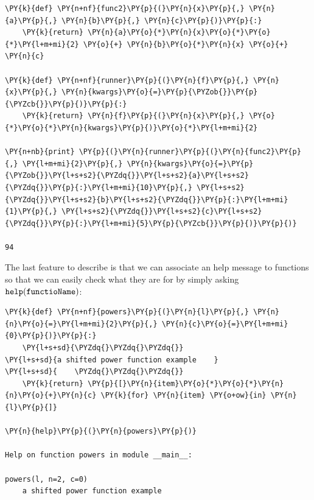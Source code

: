 \begin{codebox}
\begin{Verbatim}[commandchars=\\\{\}]
\PY{k}{def} \PY{n+nf}{func2}\PY{p}{(}\PY{n}{x}\PY{p}{,} \PY{n}{a}\PY{p}{,} \PY{n}{b}\PY{p}{,} \PY{n}{c}\PY{p}{)}\PY{p}{:}
    \PY{k}{return} \PY{n}{a}\PY{o}{*}\PY{n}{x}\PY{o}{*}\PY{o}{*}\PY{l+m+mi}{2} \PY{o}{+} \PY{n}{b}\PY{o}{*}\PY{n}{x} \PY{o}{+} \PY{n}{c}
 		
\PY{k}{def} \PY{n+nf}{runner}\PY{p}{(}\PY{n}{f}\PY{p}{,} \PY{n}{x}\PY{p}{,} \PY{n}{kwargs}\PY{o}{=}\PY{p}{\PYZob{}}\PY{p}{\PYZcb{}}\PY{p}{)}\PY{p}{:}
    \PY{k}{return} \PY{n}{f}\PY{p}{(}\PY{n}{x}\PY{p}{,} \PY{o}{*}\PY{o}{*}\PY{n}{kwargs}\PY{p}{)}\PY{o}{*}\PY{l+m+mi}{2}
 		
\PY{n+nb}{print} \PY{p}{(}\PY{n}{runner}\PY{p}{(}\PY{n}{func2}\PY{p}{,} \PY{l+m+mi}{2}\PY{p}{,} \PY{n}{kwargs}\PY{o}{=}\PY{p}{\PYZob{}}\PY{l+s+s2}{\PYZdq{}}\PY{l+s+s2}{a}\PY{l+s+s2}{\PYZdq{}}\PY{p}{:}\PY{l+m+mi}{10}\PY{p}{,} \PY{l+s+s2}{\PYZdq{}}\PY{l+s+s2}{b}\PY{l+s+s2}{\PYZdq{}}\PY{p}{:}\PY{l+m+mi}{1}\PY{p}{,} \PY{l+s+s2}{\PYZdq{}}\PY{l+s+s2}{c}\PY{l+s+s2}{\PYZdq{}}\PY{p}{:}\PY{l+m+mi}{5}\PY{p}{\PYZcb{}}\PY{p}{)}\PY{p}{)}
 
94
\end{Verbatim}
\end{codebox}
  
The last feature to describe is that we can associate an help message to functions so that 
we can easily check what they are for by simply asking $\tt{help(functioName)}$:

\begin{codebox}
\begin{Verbatim}[commandchars=\\\{\}]
\PY{k}{def} \PY{n+nf}{powers}\PY{p}{(}\PY{n}{l}\PY{p}{,} \PY{n}{n}\PY{o}{=}\PY{l+m+mi}{2}\PY{p}{,} \PY{n}{c}\PY{o}{=}\PY{l+m+mi}{0}\PY{p}{)}\PY{p}{:}
    \PY{l+s+sd}{\PYZdq{}\PYZdq{}\PYZdq{}}
\PY{l+s+sd}{a shifted power function example    }
\PY{l+s+sd}{    \PYZdq{}\PYZdq{}\PYZdq{}}
    \PY{k}{return} \PY{p}{[}\PY{n}{item}\PY{o}{*}\PY{o}{*}\PY{n}{n}\PY{o}{+}\PY{n}{c} \PY{k}{for} \PY{n}{item} \PY{o+ow}{in} \PY{n}{l}\PY{p}{]}

\PY{n}{help}\PY{p}{(}\PY{n}{powers}\PY{p}{)}

Help on function powers in module __main__:

powers(l, n=2, c=0)
    a shifted power function example
\end{Verbatim}
\end{codebox}

